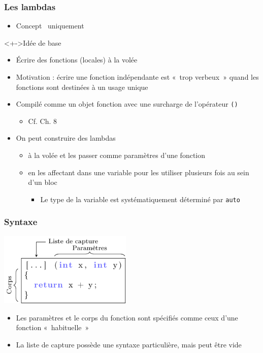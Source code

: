 \begin{frame}
\frametitle{Les lambdas}
\begin{itemize}[<+->]
\item Concept \cpp\ uniquement
\end{itemize}
\begin{exampleblock}<+->{Idée de base}
	\begin{itemize}[<+->]
	\item Écrire des fonctions (locales) à la volée
	\end{itemize}
\end{exampleblock}
\begin{itemize}[<+->]
\item Motivation : écrire une fonction indépendante est «~trop verbeux~» quand les fonctions sont destinées à un usage unique
\item Compilé comme un objet fonction avec une surcharge de l'opérateur \texttt{()}
	\begin{itemize}
	\item Cf. Ch. 8
	\end{itemize}
\item On peut construire des lambdas 
	\begin{itemize}
	\item à la volée et les passer comme paramètres d'une fonction
	\item en les affectant dans une variable pour les utiliser plusieurs fois au sein d'un bloc
		\begin{itemize}
		\item Le type de la variable est systématiquement déterminé par \lstinline|auto|
		\end{itemize}
	\end{itemize}
\end{itemize}
\end{frame}

\begin{frame}
\frametitle{Syntaxe}
\begin{center}
\includegraphics[height=3.5cm]{pics/lambda.pdf}
\end{center}
\begin{itemize}
\item Les paramètres et le corps du fonction sont spécifiés comme ceux d'une fonction «~habituelle~»
\item La liste de capture possède une syntaxe particulière, mais peut être vide
\end{itemize}
\end{frame}

